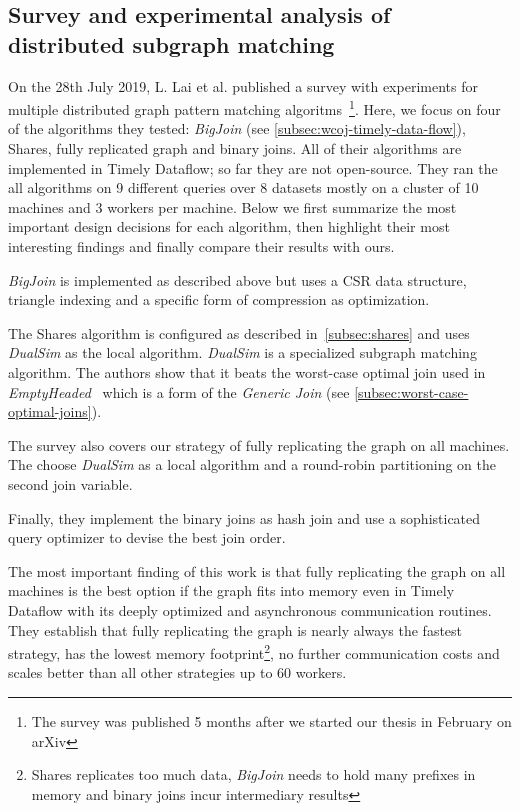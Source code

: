 
\subsection{Survey and experimental analysis of distributed subgraph matching}
On the 28th July 2019, L. Lai et al. published a survey with experiments for multiple
distributed graph pattern matching algoritms~\cite{longbin}\footnote{The survey was published 5 months after we started our thesis in
February
on
arXiv}.
Here, we focus on four of the algorithms they tested: \textit{BigJoin} (see \cref{subsec:wcoj-timely-data-flow}),
Shares, fully replicated graph and binary joins.
All of their algorithms are implemented in Timely Dataflow;
so far they are not open-source.
They ran the all algorithms on 9 different queries over 8 datasets mostly on a cluster of 10 machines
and 3 workers per machine.
Below we first summarize the most important design decisions for each algorithm, then
highlight their most interesting findings and finally compare their results with ours.

\textit{BigJoin} is implemented as described above but uses a \textsc{CSR} data structure,
triangle indexing and a specific form of compression as optimization.

The Shares algorithm is configured as described in~\cref{subsec:shares} and uses
\textit{DualSim} as the local algorithm.
\textit{DualSim} is a specialized subgraph matching algorithm.
The authors show that it beats the worst-case optimal join used in \textit{EmptyHeaded}~\cite{emptyheaded}
which is a form of the \textit{Generic Join} (see \cref{subsec:worst-case-optimal-joins}).

The survey also covers our strategy of fully replicating the graph on all machines.
The choose \textit{DualSim} as a local algorithm and a round-robin partitioning on the
second join variable.

Finally, they implement the binary joins as hash join and use a sophisticated query optimizer
to devise the best join order.

The most important finding of this work is that fully replicating the graph on all machines
is the best option if the graph fits into memory even in Timely Dataflow with its deeply
optimized and asynchronous communication routines.
They establish that fully replicating the graph is nearly always the fastest strategy,
has the lowest memory footprint\footnote{Shares replicates too much data,
\textit{BigJoin} needs to hold many prefixes in memory and binary joins incur intermediary results}, no
further
communication costs and scales better
than
all other strategies up to 60 workers.

